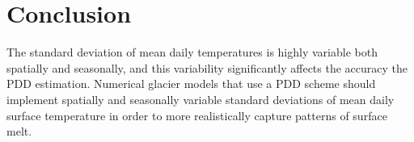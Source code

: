 \documentclass[twocolumn]{igs}
\begin{document}
\section{Conclusion}

The standard deviation of mean daily temperatures is highly variable both spatially and seasonally, and this variability significantly affects the accuracy the PDD estimation. Numerical glacier models that use a PDD scheme should implement spatially and seasonally variable standard deviations of mean daily surface temperature in order to more realistically capture patterns of surface melt.



\end{document}
